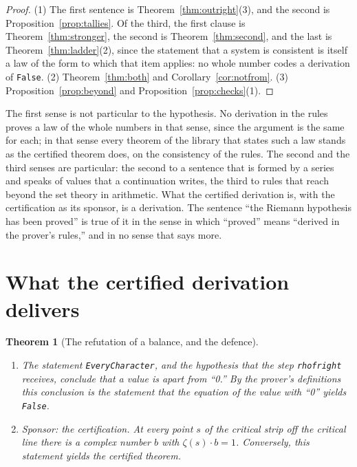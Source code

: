 \documentclass[11pt]{article}
\newtheorem{theorem}{Theorem}[section]
\theoremstyle{definition}
\theoremstyle{remark}
\DeclareRobustCommand{\lean}[1]{{\renewcommand{\_}{\textunderscore\allowbreak}\texttt{#1}}}
\newcommand{\False}{\lean{False}}
\begin{document}
\begin{proof}
(1) The first sentence is Theorem~\ref{thm:outright}(3), and the second is Proposition~\ref{prop:tallies}. Of the third, the first clause is Theorem~\ref{thm:stronger}, the second is Theorem~\ref{thm:second}, and the last is Theorem~\ref{thm:ladder}(2), since the statement that a system is consistent is itself a law of the form to which that item applies: no whole number codes a derivation of \False. (2) Theorem~\ref{thm:both} and Corollary~\ref{cor:notfrom}. (3) Proposition~\ref{prop:beyond} and Proposition~\ref{prop:checks}(1).
\end{proof}

\noindent The first sense is not particular to the hypothesis. No derivation in the rules proves a law of the whole numbers in that sense, since the argument is the same for each; in that sense every theorem of the library that states such a law stands as the certified theorem does, on the consistency of the rules. The second and the third senses are particular: the second to a sentence that is formed by a series and speaks of values that a continuation writes, the third to rules that reach beyond the set theory in arithmetic. What the certified derivation is, with the certification as its sponsor, is a derivation. The sentence ``the Riemann hypothesis has been proved'' is true of it in the sense in which ``proved'' means ``derived in the prover's rules,'' and in no sense that says more.



\section{What the certified derivation delivers}\label{sec:delivers}

\begin{theorem}[The refutation of a balance, and the defence]\label{thm:defence}
\leavevmode
\begin{enumerate}[leftmargin=2em,itemsep=1pt]
\item The statement \lean{EveryCharacter}, and the hypothesis that the step \lean{rh\_of\_right} receives, conclude that a value is apart from ``0.'' By the prover's definitions this conclusion is the statement that the equation of the value with ``0'' yields \False.
\item Sponsor: the certification. At every point $s$ of the critical strip off the critical line there is a complex number $b$ with $\zeta(s)\cdot b=1$. Conversely, this statement yields the certified theorem.
\end{enumerate}
\end{theorem}
\end{document}

